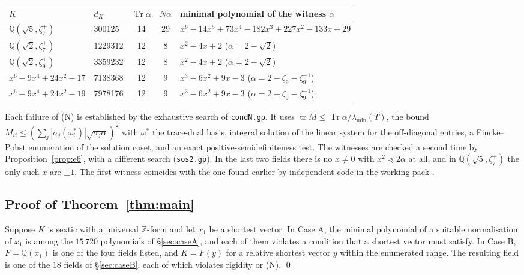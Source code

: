 \documentclass[11pt]{amsart}
\theoremstyle{definition}
\DeclareMathOperator{\Tr}{Tr}
\newcommand{\Q}{\mathbb{Q}}
\newcommand{\Z}{\mathbb{Z}}
\newcommand{\file}[1]{\texttt{#1}}
\begin{document}
\begin{center}
\begin{tabular}{llccl}
\toprule
$K$ & $d_K$ & $\Tr\alpha$ & $N\alpha$ & minimal polynomial of the witness $\alpha$\\
\midrule
$\Q(\sqrt5,\zeta_7^+)$ & 300125 & 14 & 29 & $x^6-14x^5+73x^4-182x^3+227x^2-133x+29$\\
$\Q(\sqrt2,\zeta_7^+)$ & 1229312 & 12 & 8 & $x^2-4x+2$ \quad($\alpha=2-\sqrt2$)\\
$\Q(\sqrt2,\zeta_9^+)$ & 3359232 & 12 & 8 & $x^2-4x+2$ \quad($\alpha=2-\sqrt2$)\\
$x^6-9x^4+24x^2-17$ & 7138368 & 12 & 9 & $x^3-6x^2+9x-3$ \quad($\alpha=2-\zeta_9-\zeta_9^{-1}$)\\
$x^6-9x^4+24x^2-19$ & 7978176 & 12 & 9 & $x^3-6x^2+9x-3$ \quad($\alpha=2-\zeta_9-\zeta_9^{-1}$)\\
\bottomrule
\end{tabular}
\end{center}

Each failure of (N) is established by the exhaustive search of \file{condN.gp}.  It uses
$\operatorname{tr}M\le\Tr\alpha/\lambda_{\min}(T)$, the bound
$M_{ii}\le(\sum_j|\sigma_j(\omega_i^*)|\sqrt{\sigma_j\alpha})^2$ with $\omega^*$ the
trace-dual basis, integral solution of the linear system for the off-diagonal entries, a
Fincke--Pohst enumeration of the solution coset, and an exact positive-semidefiniteness
test.  The witnesses are checked a second time by Proposition~\ref{prop:e6}, with a
different search (\file{sos2.gp}).  In the last two fields there is no $x\ne0$ with
$x^2\preceq2\alpha$ at all, and in $\Q(\sqrt5,\zeta_7^+)$ the only such $x$ are $\pm1$.
The first witness coincides with the one found earlier by independent code in the working
pack \cite{Pack}.

\subsection{Proof of Theorem~\ref{thm:main}}
Suppose $K$ is sextic with a universal $\Z$-form and let $x_1$ be a shortest vector.  In
Case A, the minimal polynomial of a suitable normalisation of $x_1$ is among the
$15\,720$ polynomials of \S\ref{sec:caseA}, and each of them violates a condition that a
shortest vector must satisfy.  In Case B, $F=\Q(x_1)$ is one of the four fields listed, and
$K=F(y)$ for a relative shortest vector $y$ within the enumerated range.  The resulting field
is one of the $18$ fields of \S\ref{sec:caseB}, each of which violates rigidity or (N).
\qed
\end{document}
